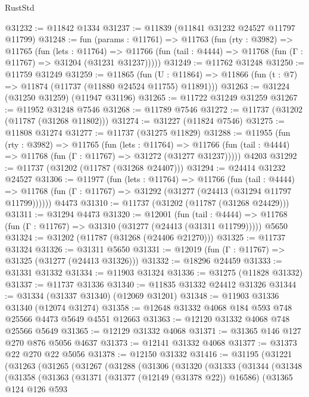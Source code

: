 \begin{lexlean}{RustStd}
\begin{coremodule}
@31232 := @11842 @1334
@31237 := @11839 (@11841 @31232 @24527 @11797 @11799)
@31248 := fun (params : @11761) =>
  @11763
    (fun (rty : @3982) =>
    @11765
      (fun (lets : @11764) =>
      @11766 (fun (tail : @4444) => @11768 (fun (Γ : @11767) => @31204 (@31231 @31237)))))
@31249 := @11762 @31248
@31250 := @11759 @31249
@31259 := @11865
    (fun (U : @11864) => @11866 (fun (t : @7) => @11874 (@11737 (@11880 @24524 @11755) @11891)))
@31263 := @31224 (@31250 @31259) (@11947 @31196)
@31265 := @11722 @31249 @31259
@31267 := @11952 @31248 @7546
@31268 := @11789 @7546
@31272 := @11737 (@31202 (@11787 (@31268 @11802)))
@31274 := @31227 (@11824 @7546)
@31275 := @11808 @31274
@31277 := @11737 (@31275 @11829)
@31288 := @11955
    (fun (rty : @3982) =>
    @11765
      (fun (lets : @11764) =>
      @11766 (fun (tail : @4444) => @11768 (fun (Γ : @11767) => @31272 (@31277 @31237)))))
    @4203
@31292 := @11737 (@31202 (@11787 (@31268 @24407)))
@31294 := @24414 @31232 @24527
@31306 := @11977
    (fun (lets : @11764) =>
    @11766
      (fun (tail : @4444) =>
      @11768 (fun (Γ : @11767) => @31292 (@31277 (@24413 (@31294 @11797 @11799))))))
    @4473
@31310 := @11737 (@31202 (@11787 (@31268 @24429)))
@31311 := @31294 @4473
@31320 := @12001
    (fun (tail : @4444) => @11768 (fun (Γ : @11767) => @31310 (@31277 (@24413 (@31311 @11799)))))
    @5650
@31324 := @31202 (@11787 (@31268 (@24406 @21270)))
@31325 := @11737 @31324
@31326 := @31311 @5650
@31331 := @12019 (fun (Γ : @11767) => @31325 (@31277 (@24413 @31326)))
@31332 := @18296 @24459
@31333 := @31331 @31332
@31334 := @11903 @31324
@31336 := @31275 (@11828 @31332)
@31337 := @11737 @31336
@31340 := @11835 @31332 @24412 @31326
@31344 := @31334 (@31337 @31340) (@12069 @31201)
@31348 := @11903 @31336 @31340 (@12074 @31274)
@31358 := @12648 @31332 @4068 @184 @593 @748 @25566 @4473 @5649 @4551 @12663
@31363 := @12120 @31332 @4068 @748 @25566 @5649
@31365 := @12129 @31332 @4068
@31371 := @31365 @146 @127 @270 @876 @5056 @4637
@31373 := @12141 @31332 @4068
@31377 := @31373 @22 @270 @22 @5056
@31378 := @12150 @31332
@31416 := @31195
    (@31221
      (@31263
        (@31265
          (@31267
            (@31288
              (@31306
                (@31320
                  (@31333
                    (@31344
                      (@31348
                        (@31358
                          (@31363
                            (@31371
                              (@31377 (@12149 (@31378 @22)) @16586)
                              (@31365
                                @124
                                @126
                                @593

\end{coremodule}
\end{lexlean}
